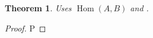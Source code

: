 \documentclass{amsart}
\newcommand{\Hom}{\operatorname{Hom}}
\newtheorem{theorem}{Theorem}
\begin{document}
\begin{theorem}\label{ed-0001}
Uses $\Hom(A,B)$ and \cite[Theorem 1]{Zed}.
\end{theorem}
\begin{proof}
P
\end{proof}
\end{document}
